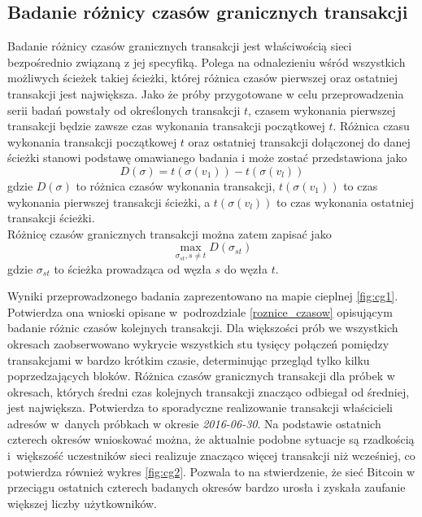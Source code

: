 \documentclass[12pt, twoside, final, openany]{mgr}
\begin{document}
\subsection{Badanie różnicy czasów granicznych transakcji}
\label{graniczne_transakcje}
\indent Badanie różnicy czasów granicznych transakcji jest właściwością sieci bezpośrednio związaną z jej specyfiką. Polega na odnalezieniu wśród wszystkich możliwych ścieżek takiej ścieżki, której różnica czasów pierwszej oraz ostatniej transakcji jest największa. Jako że próby przygotowane w celu przeprowadzenia serii badań powstały od określonych transakcji $t$, czasem wykonania pierwszej transakcji będzie zawsze czas wykonania transakcji początkowej $t$. Różnica czasu wykonania transakcji początkowej $t$ oraz ostatniej transakcji dołączonej do danej ścieżki stanowi podstawę omawianego badania i może zostać przedstawiona jako
\begin{equation}
D(\sigma) = t(\sigma(v_1)) - t(\sigma(v_l))
\end{equation}
gdzie $D(\sigma)$ to różnica czasów wykonania transakcji, $t(\sigma(v_1))$ to czas wykonania pierwszej transakcji ścieżki, a $t(\sigma(v_l))$ to czas wykonania ostatniej transakcji ścieżki.
\\ Różnicę czasów granicznych transakcji można zatem zapisać jako
\begin{equation}
 \max_{\sigma_{st},s \ne t} D(\sigma_{st})
\end{equation}
gdzie $\sigma_{st}$ to ścieżka prowadząca od węzła $s$ do węzła $t$.

\indent Wyniki przeprowadzonego badania zaprezentowano na mapie cieplnej \ref{fig:cg1}. Potwierdza ona wnioski opisane w~podrozdziale \ref{roznice_czasow} opisującym badanie różnic czasów kolejnych transakcji. Dla większości prób we wszystkich okresach zaobserwowano wykrycie wszystkich stu tysięcy połączeń pomiędzy transakcjami w bardzo krótkim czasie, determinując przegląd tylko kilku poprzedzających bloków. Różnica czasów granicznych transakcji dla próbek w okresach, których średni czas kolejnych transakcji znacząco odbiegał od średniej, jest największa. Potwierdza to sporadyczne realizowanie transakcji właścicieli adresów w~danych próbkach w okresie \textit{2016-06-30}. Na podstawie ostatnich czterech okresów wnioskować można, że aktualnie podobne sytuacje są rzadkością i~większość uczestników sieci realizuje znacząco więcej transakcji niż wcześniej, co potwierdza również wykres \ref{fig:cg2}. Pozwala to na stwierdzenie, że sieć Bitcoin w przeciągu ostatnich czterech badanych okresów bardzo urosła i zyskała zaufanie większej liczby użytkowników.
\end{document}
